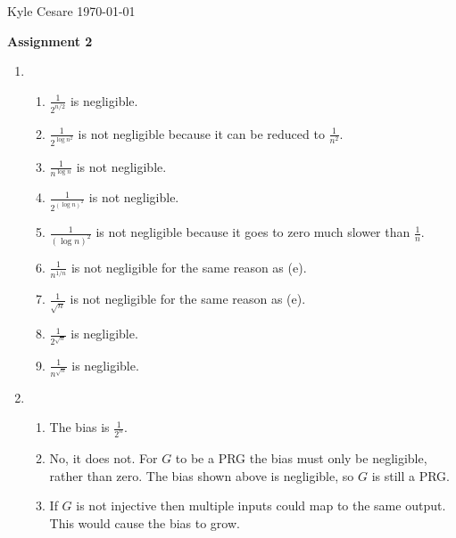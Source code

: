 \documentclass[12pt,letterpaper]{article}
\begin{document}
Kyle Cesare \hfill
\today \hfill

{\center\textbf{Assignment 2} \\}

\begin{enumerate}
  \item \begin{enumerate}
    \item $\frac{1}{2^{n/2}}$ is negligible.
    \item $\frac{1}{2^{\log n^2}}$ is not negligible because it can be reduced
      to $\frac{1}{n^2}$.
    \item $\frac{1}{n^{\log n}}$ is not negligible.
    \item $\frac{1}{2^{(\log n)^2}}$ is not negligible.
    \item $\frac{1}{(\log n)^2}$ is not negligible because it goes to zero much
      slower than $\frac{1}{n}$.
    \item $\frac{1}{n^{1/n}}$ is not negligible for the same reason as (e).
    \item $\frac{1}{\sqrt{n}}$ is not negligible for the same reason as (e).
    \item $\frac{1}{2^{\sqrt{n}}}$ is negligible.
    \item $\frac{1}{n^{\sqrt{n}}}$ is negligible.
  \end{enumerate}

  \item \begin{enumerate}
      \item The bias is $\frac{1}{2^n}$.
      \item No, it does not. For $G$ to be a PRG the bias must only be
        negligible, rather than zero. The bias shown above is negligible, so $G$
        is still a PRG.
      \item If $G$ is not injective then multiple inputs could map to the same
        output. This would cause the bias to grow.
    \end{enumerate}



\end{enumerate}
\end{document}

